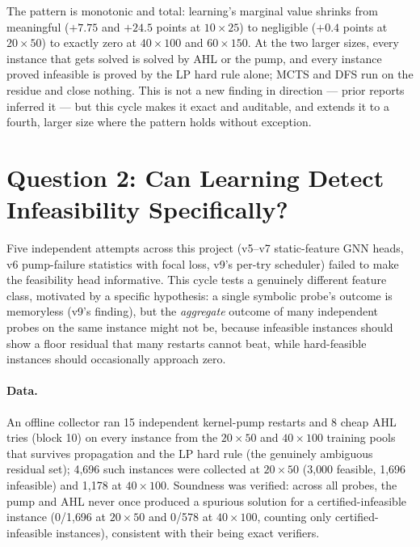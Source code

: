 \documentclass[12pt]{article}
\begin{document}
The pattern is monotonic and total: learning's marginal value shrinks from meaningful ($+7.75$ and $+24.5$ points at $10\times25$) to negligible ($+0.4$ points at $20\times50$) to exactly zero at $40\times100$ and $60\times150$. At the two larger sizes, every instance that gets solved is solved by AHL or the pump, and every instance proved infeasible is proved by the LP hard rule alone; MCTS and DFS run on the residue and close nothing. This is not a new finding in direction --- prior reports inferred it --- but this cycle makes it exact and auditable, and extends it to a fourth, larger size where the pattern holds without exception.

\section{Question 2: Can Learning Detect Infeasibility Specifically?}

Five independent attempts across this project (v5--v7 static-feature GNN heads, v6 pump-failure statistics with focal loss, v9's per-try scheduler) failed to make the feasibility head informative. This cycle tests a genuinely different feature class, motivated by a specific hypothesis: a single symbolic probe's outcome is memoryless (v9's finding), but the \emph{aggregate} outcome of many independent probes on the same instance might not be, because infeasible instances should show a floor residual that many restarts cannot beat, while hard-feasible instances should occasionally approach zero.

\paragraph{Data.} An offline collector ran 15 independent kernel-pump restarts and 8 cheap AHL tries (block 10) on every instance from the $20\times50$ and $40\times100$ training pools that survives propagation and the LP hard rule (the genuinely ambiguous residual set); 4{,}696 such instances were collected at $20\times50$ (3{,}000 feasible, 1{,}696 infeasible) and 1{,}178 at $40\times100$. Soundness was verified: across all probes, the pump and AHL never once produced a spurious solution for a certified-infeasible instance (0/1{,}696 at $20\times50$ and 0/578 at $40\times100$, counting only certified-infeasible instances), consistent with their being exact verifiers.
\end{document}
